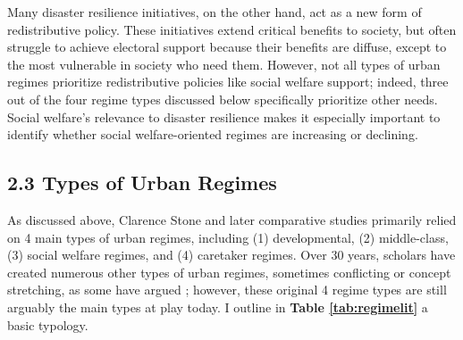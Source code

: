 \documentclass[preprint, 3p,
authoryear]{elsarticle} %
\begin{document}
Many disaster resilience initiatives, on the other hand, act as a new
form of redistributive policy. These initiatives extend critical
benefits to society, but often struggle to achieve electoral support
because their benefits are diffuse, except to the most vulnerable in
society who need them. However, not all types of urban regimes
prioritize redistributive policies like social welfare support; indeed,
three out of the four regime types discussed below specifically
prioritize other needs. Social welfare's relevance to disaster
resilience makes it especially important to identify whether social
welfare-oriented regimes are increasing or declining.

\hypertarget{types-of-urban-regimes}{%
\subsection{2.3 Types of Urban Regimes}\label{types-of-urban-regimes}}

As discussed above, Clarence Stone \citeyearpar{stone_1993} and later
comparative studies \citep{kilburn_2004, de_socio_2007} primarily relied
on 4 main types of urban regimes, including (1) developmental, (2)
middle-class, (3) social welfare regimes, and (4) caretaker regimes.
Over 30 years, scholars have created numerous other types of urban
regimes, sometimes conflicting or concept stretching, as some have
argued \citep{mossberger_and_stoker_2001}; however, these original 4
regime types are still arguably the main types at play today. I outline
in \textbf{Table \ref{tab:regimelit}} a basic typology.
\end{document}
